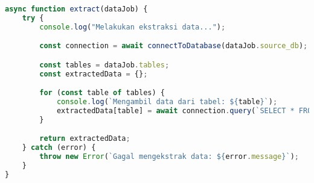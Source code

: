 \begin{lstlisting}[language=Javascript,caption={Extract Data}]
async function extract(dataJob) {
	try {
		console.log("Melakukan ekstraksi data...");

		const connection = await connectToDatabase(dataJob.source_db);

		const tables = dataJob.tables;
		const extractedData = {};

		for (const table of tables) {
			console.log(`Mengambil data dari tabel: ${table}`);
			extractedData[table] = await connection.query(`SELECT * FROM ${table}`);
		}

		return extractedData;
	} catch (error) {
		throw new Error(`Gagal mengekstrak data: ${error.message}`);
	}
}
\end{lstlisting}